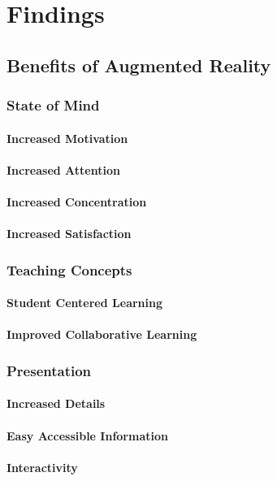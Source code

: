 \section{Findings}
\label{sec:Findings}
\subsection{Benefits of Augmented Reality}
\label{subsec:Benefits}
\subsubsection{State of Mind}
\paragraph{Increased Motivation}
\paragraph{Increased Attention}
\paragraph{Increased Concentration}
\paragraph{Increased Satisfaction}
\subsubsection{Teaching Concepts}
\paragraph{Student Centered Learning}
\paragraph{Improved Collaborative Learning}
\subsubsection{Presentation}
\paragraph{Increased Details}
\paragraph{Easy Accessible Information}
\paragraph{Interactivity}
